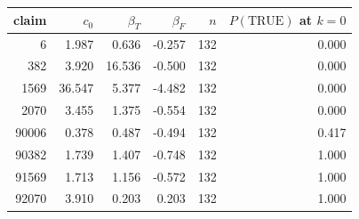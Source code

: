 \begin{tabular}{rrrrrr}
\toprule
claim & $c_0$ & $\beta_T$ & $\beta_F$ & $n$ & $P(\text{TRUE})$ at $k=0$ \\
\midrule
6 & 1.987 & 0.636 & -0.257 & 132 & 0.000 \\
382 & 3.920 & 16.536 & -0.500 & 132 & 0.000 \\
1569 & 36.547 & 5.377 & -4.482 & 132 & 0.000 \\
2070 & 3.455 & 1.375 & -0.554 & 132 & 0.000 \\
90006 & 0.378 & 0.487 & -0.494 & 132 & 0.417 \\
90382 & 1.739 & 1.407 & -0.748 & 132 & 1.000 \\
91569 & 1.713 & 1.156 & -0.572 & 132 & 1.000 \\
92070 & 3.910 & 0.203 & 0.203 & 132 & 1.000 \\
\bottomrule
\end{tabular}